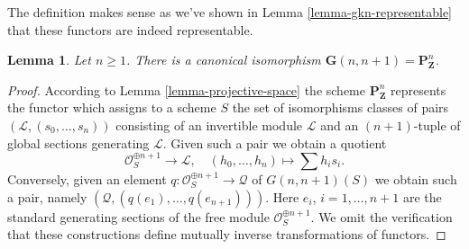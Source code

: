 \documentclass{stacks-project}
\theoremstyle{plain}
\newtheorem{lemma}[subsection]{Lemma}
\theoremstyle{definition}
\theoremstyle{remark}
\numberwithin{equation}{subsection}
\begin{document}
\noindent
The definition makes sense as we've shown in
Lemma \ref{lemma-gkn-representable}
that these functors are indeed representable.

\begin{lemma}
\label{lemma-projective-space-grassmannian}
Let $n \geq 1$. There is a canonical isomorphism
$\mathbf{G}(n, n + 1) = \mathbf{P}^n_\mathbf{Z}$.
\end{lemma}

\begin{proof}
According to Lemma \ref{lemma-projective-space} the scheme
$\mathbf{P}^n_\mathbf{Z}$ represents the functor
which assigns to a scheme $S$ the set of isomorphisms classes
of pairs $(\mathcal{L}, (s_0, \ldots, s_n))$ consisting of
an invertible module $\mathcal{L}$ and an $(n + 1)$-tuple
of global sections generating $\mathcal{L}$.
Given such a pair we obtain a quotient
$$
\mathcal{O}_S^{\oplus n + 1} \longrightarrow \mathcal{L},\quad
(h_0, \ldots, h_n) \longmapsto \sum h_i s_i.
$$
Conversely, given an element
$q : \mathcal{O}_S^{\oplus n + 1} \to \mathcal{Q}$ of $G(n, n + 1)(S)$
we obtain such a pair, namely $(\mathcal{Q}, (q(e_1), \ldots, q(e_{n + 1})))$.
Here $e_i$, $i = 1, \ldots, n + 1$ are the standard generating sections
of the free module $\mathcal{O}_S^{\oplus n + 1}$.
We omit the verification that these constructions define mutually
inverse transformations of functors.
\end{proof}






\end{document}
